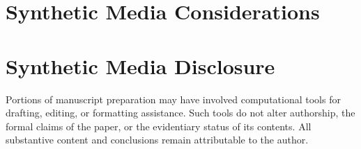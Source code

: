 
\section{Synthetic Media Considerations}

\section{Synthetic Media Disclosure}

Portions of manuscript preparation may have involved computational tools for drafting,
editing, or formatting assistance. Such tools do not alter authorship, the formal claims
of the paper, or the evidentiary status of its contents. All substantive content and
conclusions remain attributable to the author.

